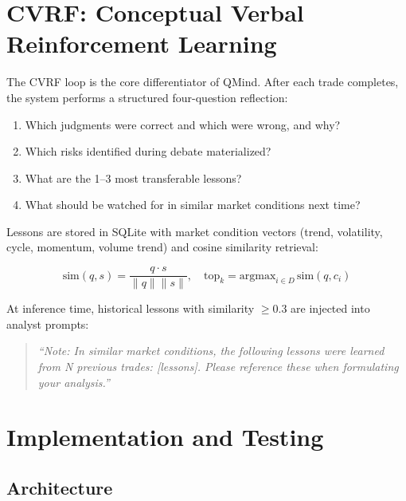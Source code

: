 \documentclass[twocolumn]{article}
\begin{document}
\section{CVRF: Conceptual Verbal Reinforcement Learning}

The CVRF loop is the core differentiator of QMind. After each trade completes, the system performs a structured four-question reflection:

\begin{enumerate}
    \item Which judgments were correct and which were wrong, and why?
    \item Which risks identified during debate materialized?
    \item What are the 1--3 most transferable lessons?
    \item What should be watched for in similar market conditions next time?
\end{enumerate}

Lessons are stored in SQLite with market condition vectors (trend, volatility, cycle, momentum, volume trend) and cosine similarity retrieval:

\begin{equation}
\text{sim}(q, s) = \frac{q \cdot s}{\|q\|\|s\|}, \quad \text{top}_k = \text{argmax}_{i \in D} \, \text{sim}(q, c_i)
\end{equation}

At inference time, historical lessons with similarity $\geq 0.3$ are injected into analyst prompts:

\begin{quote}
\textit{``Note: In similar market conditions, the following lessons were learned from N previous trades: [lessons]. Please reference these when formulating your analysis.''}
\end{quote}

\section{Implementation and Testing}

\subsection{Architecture}
\end{document}
